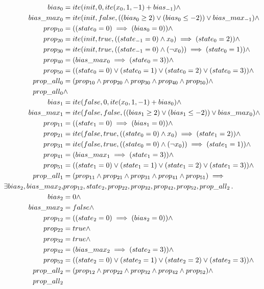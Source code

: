 \begin{equation}
\begin{aligned}
   bias_0&=ite(init, 0, ite(x_0, 1, -1)+bias_{-1}) \land \\
    bias\_max_0&=ite(init, false, ((bias_0\ge 2)\lor (bias_0\le -2))\lor bias\_max_{-1})\land \\
    prop_{10}&=((state_0=0)\implies(bias_0=0))\land \\
    prop_{20}&=ite(init, true, ((state_{-1}=0)\land x_0)\implies(state_0=2))\land \\
    prop_{30}&=ite(init, true, ((state_{-1}=0)\land (\neg x_0))\implies(state_0=1))\land \\
    prop_{40}&=(bias\_max_0\implies(state_0=3))\land \\
    prop_{50}&=((state_0=0) \lor (state_0=1) \lor (state_0=2) \lor (state_0=3))\land \\
    prop\_all_0&=(prop_{10}\land prop_{20}\land prop_{30}\land prop_{40} \land prop_{50})  \land \\
    prop\_all_0 &\land \\
    bias_1&=ite(false, 0, ite(x_0, 1, -1)+bias_0)\land \\
    bias\_max_1&=ite(false, false, ((bias_1\ge 2)\lor (bias_1\le-2))\lor bias\_max_0)\land \\
    prop_{11}&=((state_1=0)\implies(bias_1=0))\land \\
    prop_{21}&=ite(false, true, ((state_0=0)\land x_0)\implies(state_1=2))\land \\
    prop_{31}&=ite(false, true, ((state_0=0)\land (\neg x_0))\implies(state_1=1))\land \\
    prop_{41}&=(bias\_max_1\implies(state_1=3))\land \\
    prop_{51}&=((state_1=0) \lor (state_1=1) \lor (state_1=2) \lor (state_1=3))\land \\
    prop\_all_1&=(prop_{11}\land prop_{21}\land prop_{31}\land prop_{41} \land prop_{51})
\implies \\
\exists bias_2, bias\_max_2, &prop_{12}, state_2, prop_{22}, prop_{32}, prop_{42}, prop_{52}, prop\_all_2 \,.\,  \\
  bias_2&=0\land \\
  bias\_max_2&=false\land \\
  prop_{12}&=((state_2=0)\implies(bias_2=0))\land \\
  prop_{22}&=true\land \\
  prop_{32}&=true\land \\
  prop_{42}&=(bias\_max_2\implies(state_2=3))\land \\
  prop_{52}&=((state_2=0) \lor (state_2=1) \lor (state_2=2) \lor (state_2=3))\land \\
  prop\_all_2&=(prop_{12}\land prop_{22}\land prop_{32}\land prop_{42} \land prop_{52})\land \\
  prop\_all_2&\notag
\end{aligned}
\end{equation}

